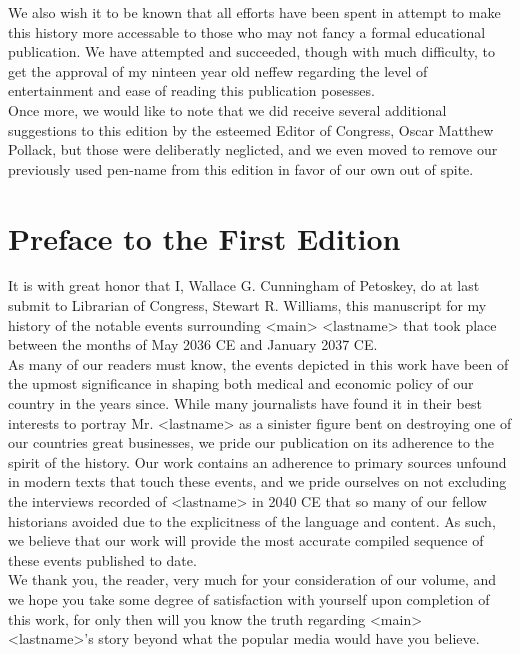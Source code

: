 \documentclass[12pt,openany]{memoir}
\begin{document}
We also wish it to be known that all efforts have been spent in attempt to make this history more accessable to those who may not fancy a formal educational publication.  We have attempted and succeeded, though with much difficulty, to get the approval of my ninteen year old neffew regarding the level of entertainment and ease of reading this publication posesses.
\\

Once more, we would like to note that we did receive several additional suggestions to this edition by the esteemed Editor of Congress, Oscar Matthew Pollack, but those were deliberatly neglicted, and we even moved to remove our previously used pen-name from this edition in favor of our own out of spite.
\\

\chapter*{Preface to the First Edition}

It is with great honor that I, Wallace G. Cunningham of Petoskey, do at last submit to Librarian of Congress, Stewart R. Williams, this manuscript for my history of the notable events surrounding <main> <lastname> that took place between the months of May 2036 CE and January 2037 CE.
\\

As many of our readers must know, the events depicted in this work have been of the upmost significance in shaping both medical and economic policy of our country in the years since.
While many journalists have found it in their best interests to portray Mr. <lastname> as a sinister figure bent on destroying one of our countries great businesses, we pride our publication on its adherence to the spirit of the history.
Our work contains an adherence to primary sources unfound in modern texts that touch these events, and we pride ourselves on not excluding the interviews recorded of <lastname> in 2040 CE that so many of our fellow historians avoided due to the explicitness of the language and content.
As such, we believe that our work will provide the most accurate compiled sequence of these events published to date.
\\

We thank you, the reader, very much for your consideration of our volume, and we hope you take some degree of satisfaction with yourself upon completion of this work, for only then will you know the truth regarding <main> <lastname>'s story beyond what the popular media would have you believe.
\\
\end{document}
